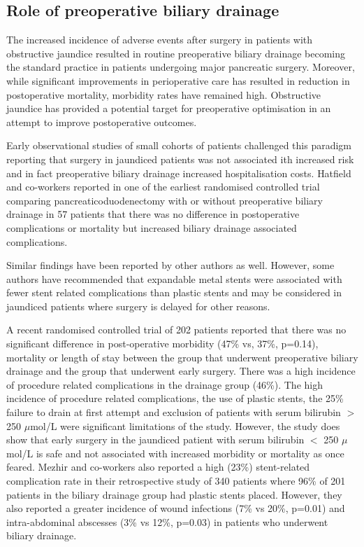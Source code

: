 \subsection{Role of preoperative biliary drainage}
The increased incidence of adverse events after surgery in patients with obstructive jaundice resulted in routine preoperative biliary drainage becoming the standard practice in patients undergoing major pancreatic surgery. Moreover, while significant improvements in perioperative care has resulted in reduction in postoperative mortality, morbidity rates have remained high. Obstructive jaundice has provided a potential target for preoperative optimisation in an attempt to improve postoperative outcomes.  

Early observational studies of small cohorts of patients challenged this paradigm reporting that surgery in jaundiced patients was not associated ith increased risk and in fact preoperative biliary drainage increased hospitalisation costs. \parencite{snellen_influence_1985, bakkevold_morbidity_1993, pitt_does_1985} Hatfield and co-workers reported in one of the earliest randomised controlled trial comparing pancreaticoduodenectomy with or without preoperative biliary drainage in 57 patients that there was no difference in postoperative complications or mortality but increased biliary drainage associated complications. \parencite{hatfield_preoperative_1982}

Similar findings have been reported by other authors as well. \parencite{lai_preoperative_1994, lai_preoperative_1994, jagannath_effect_2005} However, some authors have recommended that expandable metal stents were associated with fewer stent related complications than plastic stents and may be considered in jaundiced patients where surgery is delayed for other reasons. \parencite{wasan_use_2005, mullen_pancreaticoduodenectomy_2005}

A recent randomised controlled trial of 202 patients reported that there was no significant difference in post-operative morbidity (47\% vs, 37\%, p=0.14), mortality or length of stay between the group that underwent preoperative biliary drainage and the group that underwent early surgery. There was a high incidence of procedure related complications in the drainage group (46\%). The high incidence of procedure related complications, the use of plastic stents, the 25\% failure to drain at first attempt and exclusion of patients with serum bilirubin $>$ 250 $\mu$mol/L were significant limitations of the study. However, the study does show that early surgery in the jaundiced patient with serum bilirubin $<$ 250 $\mu$mol/L is safe and not associated with increased morbidity or mortality as once feared. Mezhir and co-workers also reported a high (23\%) stent-related complication rate in their retrospective study of 340 patients where 96\% of 201 patients in the biliary drainage group had plastic stents placed. However, they also reported a greater incidence of wound infections (7\% vs 20\%, p=0.01) and intra-abdominal abscesses (3\% vs 12\%, p=0.03) in patients who underwent biliary drainage.

